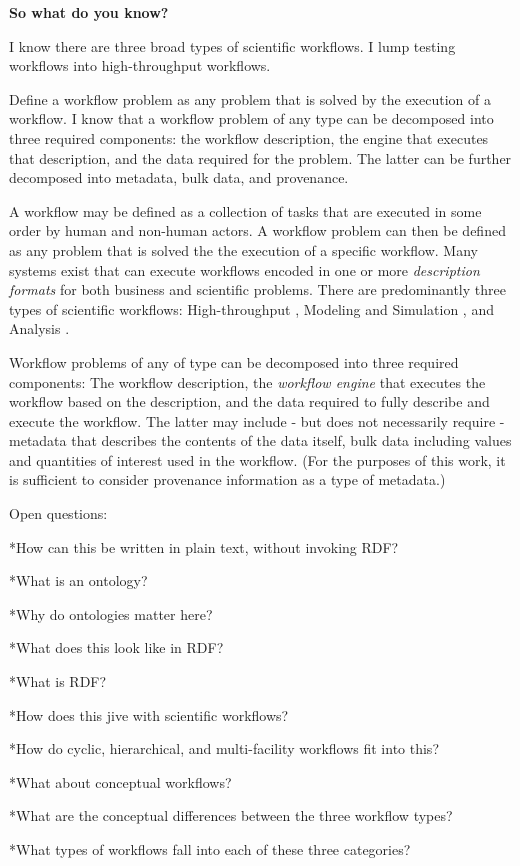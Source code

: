 \textbf{So what do you know?}

I know there are three broad types of scientific workflows. I lump testing workflows into high-throughput workflows.

Define a workflow problem as any problem that is solved by the execution of a workflow. I know that a workflow problem of any type can be decomposed into three required components: the workflow description, the engine that executes that description, and the data required for the problem. The latter can be further decomposed into metadata, bulk data, and provenance. 

A workflow may be defined as a collection of tasks that are executed in some order by human and non-human actors. A workflow problem can then be defined as any problem that is solved the the execution of a specific workflow. Many systems exist that can execute workflows encoded in one or more \textit{description formats} for both business and scientific problems. There are predominantly three types of scientific workflows: High-throughput \cite{}, Modeling and Simulation \cite{}, and Analysis \cite{}.

Workflow problems of any of type can be decomposed into three required components: The workflow description, the \textit{workflow engine} that executes the workflow based on the description, and the data required to fully describe and execute the workflow. The latter may include - but does not necessarily require - metadata that describes the contents of the data itself, bulk data including values and quantities of interest used in the workflow. (For the purposes of this work, it is sufficient to consider provenance information as a type of metadata.)

Open questions: 

*How can this be written in plain text, without invoking RDF?

*What is an ontology?

*Why do ontologies matter here?

*What does this look like in RDF?

*What is RDF?

*How does this jive with scientific workflows?

*How do cyclic, hierarchical, and multi-facility workflows fit into this?

*What about conceptual workflows?

*What are the conceptual differences between the three workflow types?

*What types of workflows fall into each of these three categories? 
